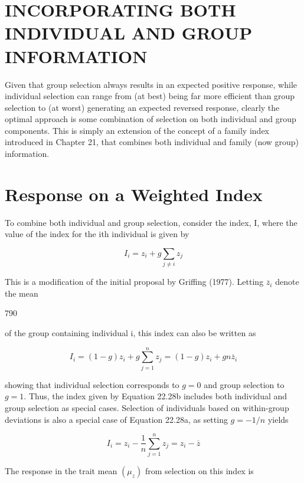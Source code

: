 \documentclass{article}
\begin{document}
\section{INCORPORATING BOTH INDIVIDUAL AND GROUP INFORMATION}
Given that group selection always results in an expected positive response, while individual selection can range from (at best) being far more efficient than group selection to (at worst) generating an expected reversed response, clearly the optimal approach is some combination of selection on both individual and group components. This is simply an extension of the concept of a family index introduced in Chapter 21, that combines both individual and family (now group) information.

\section{Response on a Weighted Index}
To combine both individual and group selection, consider the index, I, where the value of the index for the ith individual is given by

\begin{equation}
I_{i}=z_{i}+g\sum_{j\neq i}z_{j}
\tag{22.28a}
\label{eq:22_28a}
\end{equation}

This is a modification of the initial proposal by Griffing (1977). Letting  $ \overline{z}_{i} $ denote the mean

790

of the group containing individual i, this index can also be written as

\begin{equation}
I_{i}=(1-g)z_{i}+g\sum_{j=1}^{n}z_{j}=(1-g)z_{i}+g n\overline{z}_{i}
\tag{22.28b}
\label{eq:22_28b}
\end{equation}

showing that individual selection corresponds to $g=0$ and group selection to $g=1$. Thus, the index given by Equation 22.28b includes both individual and group selection as special cases. Selection of individuals based on within-group deviations is also a special case of Equation 22.28a, as setting $g=-1/n$ yields

\begin{equation}
I_{i}=z_{i}-\frac{1}{n}\sum_{j=1}^{n}z_{j}=z_{i}-\overline{z}
\tag{22.28c}
\label{eq:22_28c}
\end{equation}

The response in the trait mean  $ (\mu_{z}) $ from selection on this index is
\end{document}
